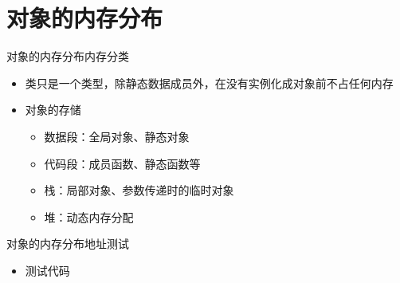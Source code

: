 \section[对象的内存分布]{对象的内存分布}\label{sec:chap03-sec07}
\begin{frame}[t,  fragile]{对象的内存分布}{内存分类}%
  \stretchon
  \begin{itemize}
  \item 类只是一个类型，除静态数据成员外，\alert{在没有实例化成对象前不占任何内存}
  \item 对象的存储
    \begin{itemize}
    \item \alert{数据段}：全局对象、静态对象
    \item \alert{代码段}：成员函数、静态函数等
    \item \alert{栈}：局部对象、参数传递时的临时对象
    \item \alert{堆}：动态内存分配
    \end{itemize}
  \end{itemize}
  \stretchoff
\end{frame}

\begin{frame}[t, fragile]{对象的内存分布}{地址测试}%
  \begin{itemize}
  \item 测试代码
  \end{itemize}
  \begin{center}
    \hspace{0.5em}
    \begin{minipage}{0.34\linewidth}
    \end{minipage}\quad
    \begin{minipage}{0.585\linewidth}
    \end{minipage}
  \end{center}
\end{frame}

